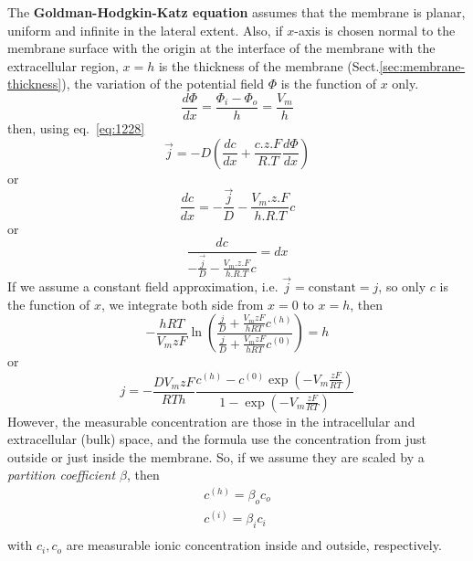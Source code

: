 The {\bf Goldman-Hodgkin-Katz equation} assumes that the membrane is
planar, uniform and infinite in the lateral extent. Also, if $x$-axis
is chosen normal to the membrane surface with the origin at the
interface of the membrane with the extracellular region, $x=h$ is the
thickness of the membrane (Sect.\ref{sec:membrane-thickness}), the variation of
the potential field $\Phi$ is the function of $x$ only.
\begin{equation}
  \label{eq:1234}
  \frac{d\Phi}{dx} = \frac{\Phi_i-\Phi_o}{h}=\frac{V_m}{h}
\end{equation}
then, using eq.~\eqref{eq:1228}
\begin{equation}
  \label{eq:1235}
  \overrightarrow{j} = -D(\frac{dc}{dx}+\frac{c.z.F}{R.T}\frac{d\Phi}{dx})
\end{equation}
or
\begin{equation}
  \label{eq:1236}
  \frac{dc}{dx}=  -\frac{\overrightarrow{j}}{D}- \frac{V_m.z.F}{h.R.T}c
\end{equation}
or
\begin{equation}
  \label{eq:1237}
  \frac{dc}{ -\frac{\overrightarrow{j}}{D}- \frac{V_m.z.F}{h.R.T}c} = dx
\end{equation}
If we assume a constant field approximation, i.e. $\overrightarrow{j}
= \text{constant} = j$, so only $c$ is the function of $x$, we
integrate both side from $x=0$ to $x=h$, then
\begin{equation}
  \label{eq:1238}
  -\frac{hRT}{V_mzF}\ln\left(\frac{\frac{j}{D}+\frac{V_mzF}{hRT}c^{(h)}}{\frac{j}{D}+\frac{V_mzF}{hRT}c^{(0)}}\right) = h
\end{equation}
or
\begin{equation}
  \label{eq:1239}
  j = -\frac{DV_mzF}{RTh} \frac{c^{(h)}-c^{(0)}\exp(-V_m\frac{zF}{RT})}{1-\exp(-V_m\frac{zF}{RT})}
\end{equation}
However, the measurable concentration are those in the intracellular
and extracellular (bulk) space, and the formula use the concentration
from just outside or just inside the membrane. So, if we assume they
are scaled by a {\it partition coefficient $\beta$}, then
\begin{equation}
  \label{eq:1240}
  \begin{split}
    c^{(h)} = \beta_o c_o \\
    c^{(i)} = \beta_i c_i \\
  \end{split}
\end{equation}
with $c_i,c_o$ are measurable ionic concentration inside and outside,
respectively. 

